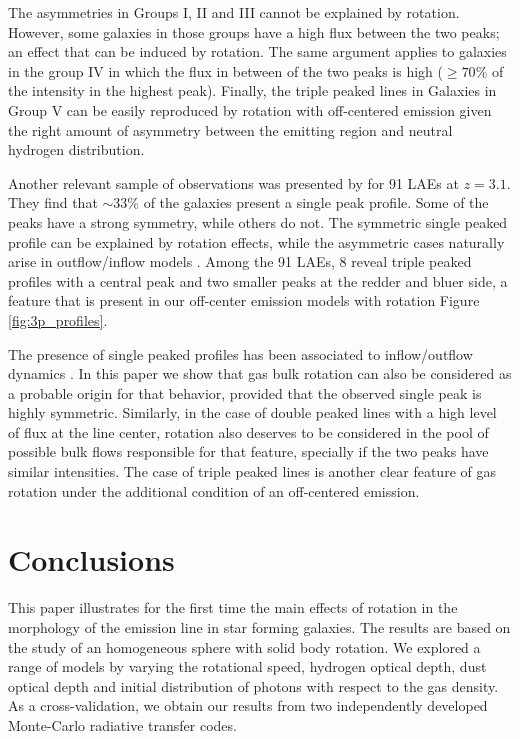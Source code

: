 \documentclass{emulateapj}
\newcommand{\ly}{{\ifmmode{{\rm Ly}\alpha~}\else{Ly$\alpha$~}\fi}}
\begin{document}
The asymmetries in Groups I, II  and III cannot be explained by
rotation. However, some galaxies in those groups have a high flux between
the two peaks; an effect that can be induced by rotation. The same
argument applies to galaxies in the group IV in which the flux
in between of the two peaks is high ($ \geq 70 \%$ of the intensity in
the highest peak). Finally, the triple peaked lines in Galaxies in
Group V can be easily reproduced by rotation with off-centered
emission given the right amount of asymmetry between the emitting
region and neutral hydrogen distribution. 

Another relevant sample of observations was presented by \cite{Yamada2012} 
for 91 LAEs at $z=3.1$. They find that $\sim 33 \%$ of the galaxies present 
a single peak profile. Some of the peaks have a strong symmetry, while
others do not. The symmetric single peaked profile can be explained by
rotation effects, while the asymmetric cases naturally arise in
outflow/inflow models \citep{Verhamme2008, Dijkstra06}. Among the 91
LAEs, 8 reveal triple peaked profiles with a central peak and two
smaller peaks at the redder and bluer side, a feature that is present
in our off-center emission models with rotation Figure \ref{fig:3p_profiles}. 

The presence of single peaked profiles has been associated to
inflow/outflow dynamics \citep{XXX}. In this paper we show that gas
bulk rotation can also be considered as a probable origin for that
behavior, provided that the observed single peak is highly
symmetric. Similarly, in the case of double peaked lines with a high
level of flux at the line center, rotation also deserves to be considered in
the pool of possible bulk flows responsible for that feature,
specially if the two peaks have similar intensities. The case of
triple peaked lines is another clear feature of gas rotation under the
additional condition of an off-centered emission. 

\section{Conclusions}
\label{sec:conclusions}

This paper illustrates for the first time the main effects of rotation
in the morphology of the \ly emission line in star forming galaxies. 
The results are based on the study of an homogeneous sphere
with solid body rotation. We explored a range of models by varying
the rotational speed, hydrogen optical depth, dust optical depth and
initial distribution of \ly photons with respect to the gas
density. As a cross-validation, we obtain our results from two
independently developed Monte-Carlo radiative transfer codes.
\end{document}
